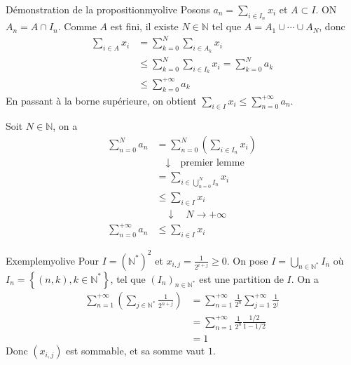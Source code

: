     \begin{demo}{Démonstration de la proposition}{myolive}
        Posons $a_n = \sum_{i \in I_n} x_i$ et $A \subset I$. ON $A_n = A \cap I_n$. Comme $A$ est fini, il existe $N \in \mathbb{N}$ tel que $A = A_1 \cup \cdots \cup A_N$, donc 
        \begin{align*}
            \sum_{i \in A} x_i 
            &= \sum_{k=0}^N \sum_{i \in A_k} x_i \\
            &\leq \sum_{k=0}^{N} \sum_{i \in I_k} x_i = \sum_{k=0}^N a_k \\
            &\leq \sum_{k=0}^{+\infty} a_k
        \end{align*}
        En passant à la borne supérieure, on obtient $\sum_{i \in I} x_i \leq \sum_{n = 0}^{+\infty} a_n$.

        Soit $N \in \mathbb{N}$, on a 
        \begin{align*}
            \sum_{n=0}^N a_n 
            &= \sum_{n=0}^{N} (\sum_{i \in I_n} x_i) \\
            &\quad \downarrow \quad \text{premier lemme} \\
            &= \sum_{i \in \bigcup_{n=0}^N I_n} x_i \\
            &\leq \sum_{i \in I} x_i \\
            &\quad \downarrow \quad N \to +\infty \\
            \sum_{n = 0}^{+\infty} a_n &\leq \sum_{i \in I} x_i 
        \end{align*}
    \end{demo} 

    \begin{omed}{Exemple}{myolive}
        Pour $I = \left(\mathbb{N}^*\right)^2$ et $x_{i,j} = \frac{1}{2^{i + j}} \geq 0$. On pose $I = \bigcup_{n \in \mathbb{N}^*} I_n$ où $I_n = \left\{(n,
        k), k \in \mathbb{N}^*\right\}$, tel que $(I_n)_{n \in \mathbb{N}^*}$ est une partition de $I$. On a 
        \begin{align*}
            \sum_{n=1}^{+\infty} \left(\sum_{j \in \mathbb{N}^*} \frac{1}{2^{n + j}}\right) 
            &= \sum_{n=1}^{+\infty} \frac{1}{2^n} \sum_{j = 1}^{+\infty} \frac{1}{2^j} \\
            &= \sum_{n=1}^{+\infty} \frac{1}{2^n} \frac{1/2}{1 - 1/2} \\
            &= 1
        \end{align*}
        Donc $(x_{i,j})$ est sommable, et sa somme vaut $1$.
    \end{omed}

